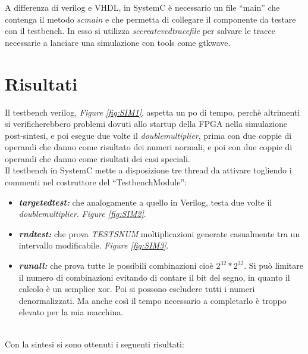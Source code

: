 \documentclass[]{IEEEtran}
\begin{document}
A differenza di verilog e VHDL, in SystemC è necessario un file ``main'' che contenga il metodo {\it sc\textunderscore main} e che permetta di collegare il componente da testare con il testbench. In esso si utilizza {\it sc\textunderscore create\textunderscore vcd\textunderscore trace\textunderscore file} per salvare le tracce necessarie a lanciare una simulazione con tools come gtkwave.


\section{Risultati}
Il testbench verilog, {\it Figure \ref{fig:SIM1}}, aspetta un po di tempo, perchè altrimenti si verificherebbero problemi dovuti allo startup della FPGA nella simulazione post-sintesi, e poi esegue due volte il {\it double\textunderscore multiplier}, prima con due coppie di operandi che danno come risultato dei numeri normali, e poi con due coppie di operandi che danno come risultati dei casi speciali. \\

Il testbench in SystemC mette a disposizione tre thread da attivare togliendo i commenti nel costruttore del ``TestbenchModule'':
\begin{itemize}
\item {\it\bf targeted\textunderscore test:} che analogamente a quello in Verilog, testa due volte il {\it double\textunderscore multiplier}. {\it Figure \ref{fig:SIM2}}.
\item {\it\bf rnd\textunderscore test:} che prova {\it TESTS\textunderscore NUM} moltiplicazioni generate casualmente tra un intervallo modificabile. {\it Figure \ref{fig:SIM3}}.
\item {\it\bf run\textunderscore all:} che prova tutte le possibili combinazioni cioè \(2^{32} * 2^{32}\). Si può limitare il numero di combinazioni evitando di contare il bit del segno, in quanto il calcolo è un semplice xor. Poi si possono escludere tutti i numeri denormalizzati. Ma anche così il tempo necessario a completarlo è troppo elevato per la mia macchina.
\end{itemize} \\

Con la sintesi si sono ottenuti i seguenti risultati:
\end{document}
